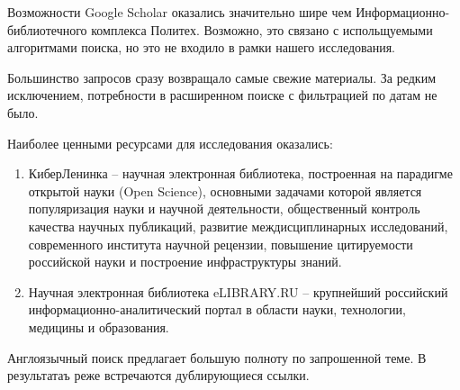 \documentclass[a4paper, 12pt]{report}		%
\begin{document}
Возможности Google Scholar оказались значительно шире чем Информационно-библиотечного комплекса Политех. Возможно, это связано с испольщуемыми алгоритмами поиска, но это не входило в рамки нашего исследования.

Большинство запросов сразу возвращало самые свежие материалы. За редким исключением, потребности в расширенном поиске с фильтрацией по датам не было.

Наиболее ценными ресурсами для исследования оказались:
\begin{enumerate}
\item КиберЛенинка -- научная электронная библиотека, построенная на парадигме открытой науки (Open Science), основными задачами которой является популяризация науки и научной деятельности, общественный контроль качества научных публикаций, развитие междисциплинарных исследований, современного института научной рецензии, повышение цитируемости российской науки и построение инфраструктуры знаний. 
\item Научная электронная библиотека eLIBRARY.RU -- крупнейший российский информационно-аналитический портал в области науки, технологии, медицины и образования.
\end{enumerate}

Англоязычный поиск предлагает большую полноту по запрошенной теме. В результатаъ реже встречаются дублирующиеся ссылки.
\end{document}
